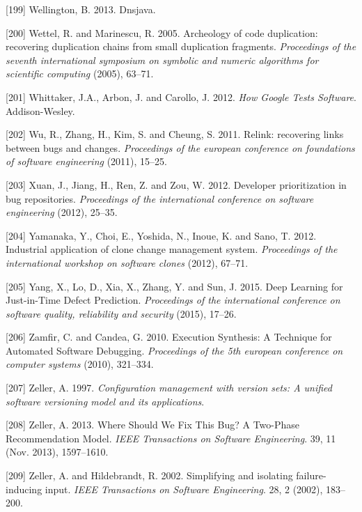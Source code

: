 \documentclass[12pt]{report}
\begin{document}
\hypertarget{ref-Wellington2013}{}
{[}199{]} Wellington, B. 2013. Dnsjava.

\hypertarget{ref-Wettel2005}{}
{[}200{]} Wettel, R. and Marinescu, R. 2005. Archeology of code
duplication: recovering duplication chains from small duplication
fragments. \emph{Proceedings of the seventh international symposium on
symbolic and numeric algorithms for scientific computing} (2005),
63--71.

\hypertarget{ref-Whittaker2012}{}
{[}201{]} Whittaker, J.A., Arbon, J. and Carollo, J. 2012. \emph{How
Google Tests Software}. Addison-Wesley.

\hypertarget{ref-Wu2011}{}
{[}202{]} Wu, R., Zhang, H., Kim, S. and Cheung, S. 2011. Relink:
recovering links between bugs and changes. \emph{Proceedings of the
european conference on foundations of software engineering} (2011),
15--25.

\hypertarget{ref-Xuan2012}{}
{[}203{]} Xuan, J., Jiang, H., Ren, Z. and Zou, W. 2012. Developer
prioritization in bug repositories. \emph{Proceedings of the
international conference on software engineering} (2012), 25--35.

\hypertarget{ref-yamanaka2012industrial}{}
{[}204{]} Yamanaka, Y., Choi, E., Yoshida, N., Inoue, K. and Sano, T.
2012. Industrial application of clone change management system.
\emph{Proceedings of the international workshop on software clones}
(2012), 67--71.

\hypertarget{ref-Yang2015}{}
{[}205{]} Yang, X., Lo, D., Xia, X., Zhang, Y. and Sun, J. 2015. Deep
Learning for Just-in-Time Defect Prediction. \emph{Proceedings of the
international conference on software quality, reliability and security}
(2015), 17--26.

\hypertarget{ref-Zamfir2010}{}
{[}206{]} Zamfir, C. and Candea, G. 2010. Execution Synthesis: A
Technique for Automated Software Debugging. \emph{Proceedings of the 5th
european conference on computer systems} (2010), 321--334.

\hypertarget{ref-Zeller1997}{}
{[}207{]} Zeller, A. 1997. \emph{Configuration management with version
sets: A unified software versioning model and its applications}.

\hypertarget{ref-Zeller2013a}{}
{[}208{]} Zeller, A. 2013. Where Should We Fix This Bug? A Two-Phase
Recommendation Model. \emph{IEEE Transactions on Software Engineering}.
39, 11 (Nov. 2013), 1597--1610.

\hypertarget{ref-Zeller2002}{}
{[}209{]} Zeller, A. and Hildebrandt, R. 2002. Simplifying and isolating
failure-inducing input. \emph{IEEE Transactions on Software
Engineering}. 28, 2 (2002), 183--200.
\end{document}
